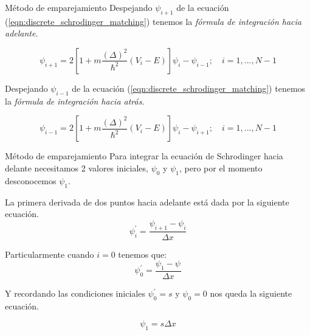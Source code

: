 \begin{frame}{Método de emparejamiento}
    Despejando $\psi_{i+1}$ de la ecuación (\ref{eqn:discrete_schrodinger_matching}) tenemos la \emph{fórmula de integración hacia adelante}.

    \begin{equation}
        \psi_{i+1}
        =
        2\left[
            1+ m\frac{(\Delta)^2}{\hbar^2} (V_i - E) 
        \right] \psi_i - \psi_{i-1}
        ;\quad
        i= 1,...,N-1
        \label{eqn:integracion_adelante_matching}
    \end{equation}

    Despejando $\psi_{i-1}$ de la ecuación (\ref{eqn:discrete_schrodinger_matching}) tenemos la \emph{fórmula de integración hacia atrás}.

    \begin{equation}
        \psi_{i-1}
        =
        2\left[
            1+ m\frac{(\Delta)^2}{\hbar^2} (V_i - E) 
        \right] \psi_i - \psi_{i+1}
        ;\quad
        i= 1,...,N-1
        \label{eqn:integracion_atras_matching}
    \end{equation}

\end{frame}

\begin{frame}{Método de emparejamiento}
    Para integrar la ecuación de Schrodinger hacia delante necesitamos 2 valores iniciales, $\psi_0$ y $\psi_1$, pero por el momento desconocemos $\psi_1$.

    La primera derivada de dos puntos hacia adelante está dada por la siguiente ecuación.
    \begin{equation}
        \psi^{'}_{i} = \frac{\psi_{i+1} - \psi_{i} }{ \Delta x}
    \end{equation}

    Particularmente cuando $i=0$ tenemos que:
    \begin{equation}
        \psi^{'}_{0} = \frac{\psi_{1} - \psi_{} }{ \Delta x}
    \end{equation}

    Y recordando las condiciones iniciales $\psi^{'}_{0}=s$ y $\psi_{0}=0$ nos queda la siguiente ecuación.

    \begin{equation}
        \psi_{1} = s \Delta x
    \end{equation}


\end{frame}